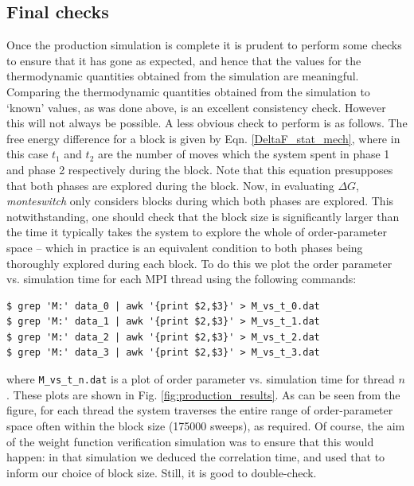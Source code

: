 \documentclass{report}
\begin{document}
\subsection{Final checks}
Once the production simulation is complete it is prudent to perform some checks to ensure that it has gone as expected, and hence that the values for the
thermodynamic quantities obtained from the simulation are meaningful. Comparing the thermodynamic quantities obtained from the simulation 
to `known' values, as was done above, is an excellent consistency check. However this will not always be possible. A less obvious check to perform is 
as follows.
%
The free energy difference for a block is given by Eqn. \eqref{DeltaF_stat_mech}, where in this case $t_1$ and $t_2$ are the number of moves which the 
system spent in phase 1 and phase 2 respectively during the block. Note that this equation presupposes that both phases are explored during the block. 
Now, in evaluating $\Delta G$, \emph{monteswitch} only considers blocks during which both phases are explored. This notwithstanding, one should check that
the block size is significantly larger than the time it typically takes the system to explore the whole of order-parameter space -- which in practice
is an equivalent condition to both phases being thoroughly explored during each block. To do this we plot the order parameter vs. simulation time for each
MPI thread using the following commands:
\begin{verbatim}
$ grep 'M:' data_0 | awk '{print $2,$3}' > M_vs_t_0.dat
$ grep 'M:' data_1 | awk '{print $2,$3}' > M_vs_t_1.dat
$ grep 'M:' data_2 | awk '{print $2,$3}' > M_vs_t_2.dat
$ grep 'M:' data_3 | awk '{print $2,$3}' > M_vs_t_3.dat
\end{verbatim}
where \texttt{M\_vs\_t\_n.dat} is a plot of order parameter vs. simulation time for thread $n$. These plots are shown in Fig. \ref{fig:production_results}.
As can be seen from the figure, for each thread the system traverses the entire range of order-parameter space often within the block size (175000 
sweeps), as required.
%
Of course, the aim of the weight function verification simulation was to ensure that this would happen: in that simulation we deduced the correlation time,
and used that to inform our choice of block size. Still, it is good to double-check.
\end{document}
